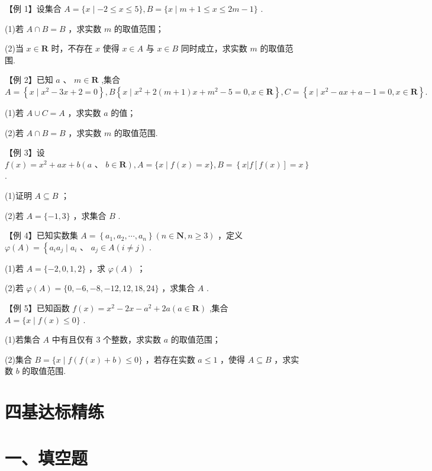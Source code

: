 【例 1】设集合 $A = \{ x \mid   - 2 \leq  x \leq  5\} ,B = \{ x \mid  m + 1 \leq  x \leq  {2m} - 1\}$ .

(1)若 $A \cap  B = B$ ，求实数 $m$ 的取值范围；

(2)当 $x \in  \mathbf{R}$ 时，不存在 $x$ 使得 $x \in  A$ 与 $x \in  B$ 同时成立，求实数 $m$ 的取值范围.

【例 2】已知 $a\text{ 、 }m \in  \mathbf{R}$ ,集合 $A = \left\{  {x \mid  {x}^{2} - {3x} + 2 = 0}\right\}  ,B\left\{  {x \mid  {x}^{2} + 2\left( {m + 1}\right) x + {m}^{2} - 5 = 0,x \in  \mathbf{R}}\right\}  ,C =  \left\{  {x \mid  {x}^{2} - {ax} + a - 1 = 0,x \in  \mathbf{R}}\right\}  .$

(1)若 $A \cup  C = A$ ，求实数 $a$ 的值；

(2)若 $A \cap  B = B$ ，求实数 $m$ 的取值范围.

【例 3】设 $f\left( x\right)  = {x}^{2} + {ax} + b\left( {a\text{ 、 }b \in  \mathbf{R}}\right) ,A = \{ x \mid  f\left( x\right)  = x\} ,B = \left\{  {x\left| {f\left\lbrack  {f\left( x\right) }\right\rbrack   = x}\right. }\right\}$ .

(1)证明 $A \subseteq  B$ ；

(2)若 $A = \{  - 1,3\}$ ，求集合 $B$ .

【例 4】已知实数集 $A = \left\{  {{a}_{1},{a}_{2},\cdots ,{a}_{n}}\right\}  \left( {n \in  \mathbf{N},n \geq  3}\right)$ ，定义 $\varphi \left( A\right)  = \left\{  {{a}_{i}{a}_{j} \mid  {a}_{i}\text{ 、 }{a}_{j} \in  A\left( {i \neq  j}\right) }\right.$ .

(1)若 $A = \{  - 2,0,1,2\}$ ，求 $\varphi \left( A\right)$ ；

(2)若 $\varphi \left( A\right)  = \{ 0, - 6, - 8, - {12},{12},{18},{24}\}$ ，求集合 $A$ .

【例 5】已知函数 $f\left( x\right)  = {x}^{2} - {2x} - {a}^{2} + {2a}\left( {a \in  \mathbf{R}}\right)$ ,集合 $A = \{ x \mid  f\left( x\right)  \leq  0\}$ .

(1)若集合 $A$ 中有且仅有 3 个整数，求实数 $a$ 的取值范围；

(2)集合 $B = \{ x \mid  f\left( {f\left( x\right)  + b}\right)  \leq  0\}$ ，若存在实数 $a \leq  1$ ，使得 $A \subseteq  B$ ，求实数 $b$ 的取值范围.

\section*{四基达标精练}

\section*{一、填空题}

